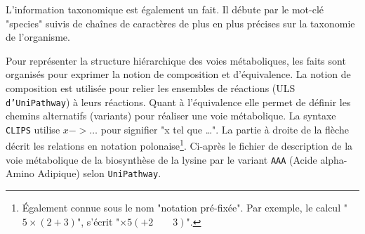 \begin{refsegment}
L'information taxonomique est également un fait. Il débute par le mot-clé "species" suivis de chaînes de caractères de plus en plus précises sur la taxonomie de l'organisme.


Pour représenter la structure hiérarchique des voies métaboliques, les faits sont organisés pour exprimer la notion de composition et d'équivalence. La notion de composition est utilisée pour relier les ensembles de réactions (\gls{ULS} \texttt{d’UniPathway}) à leurs réactions. Quant à l'équivalence elle permet de définir les chemins alternatifs (variants) pour réaliser une voie métabolique. La syntaxe \texttt{\gls{CLIPS}} utilise $x -> \ldots$ pour signifier "x tel que \ldots". La partie à droite de la flèche décrit les relations en notation polonaise\footnote{Également connue sous le nom "notation pré-fixée". Par exemple, le calcul "$5 \times (2 + 3)$", s'écrit "$\times 5 (+ 2 \qquad 3)$". }. Ci-après le fichier de description de la voie métabolique de la biosynthèse de la lysine par le variant \texttt{AAA} (Acide alpha-Amino Adipique) selon \texttt{UniPathway}.


\end{refsegment}
